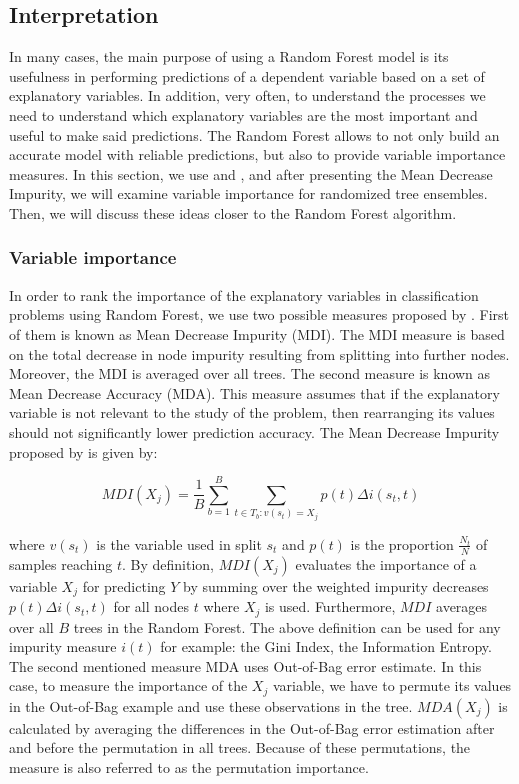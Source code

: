\subsection{Interpretation}
In many cases, the main purpose of using a Random Forest model is its usefulness in performing predictions 
of a dependent variable based on a set of explanatory variables. 
In addition, very often, to understand the processes we need to understand
which explanatory variables are the most important and useful to make said predictions. 
The Random Forest allows to not only build an accurate model with reliable predictions, 
but also to provide variable importance measures.
In this section, we  use \cite{louppe2013understanding} 
and \cite{gerard2016foresttour}, and after presenting the Mean Decrease Impurity,
we will examine variable importance for randomized tree ensembles.
Then, we will discuss these ideas closer to the Random Forest algorithm.

\subsubsection{Variable importance}
In order to rank the importance of the explanatory variables in classification problems using Random Forest, 
we use two possible measures proposed by \cite{breiman2001random}. 
First of them is known as Mean Decrease Impurity (MDI). The MDI measure is based on the total decrease in node impurity 
resulting from splitting into further nodes. Moreover, the MDI is averaged over all trees. 
The second measure is known as Mean Decrease Accuracy (MDA). 
This measure assumes that if the explanatory variable is not relevant to the study of the problem,
then rearranging its values should not significantly lower prediction accuracy.
The Mean Decrease Impurity proposed by \cite{breiman2001random} is given by: 

\begin{equation}\label{eq:MDI}
	{MDI}( X_{j} ) = \frac{1}{B} \displaystyle \sum_{b=1}^{B}  \displaystyle\sum_{t \in T_{b}: v(s_{t})=  X_{j}  } p(t)\Delta i(s_{t}, t)
\end{equation}

where $ v(s_{t}) $ is the variable used in split $s_{t}$ and $ p(t) $ is the proportion $\frac{N_{t}}{N}$ of samples reaching $t$.
By definition, $ MDI( X_{j} ) $ evaluates the importance of a variable $ X_{j} $ for predicting $Y$ by 
summing over the weighted impurity decreases $p(t) \Delta i(s_{t}, t)$ for all nodes $t$ where $ X_{j}$ is used. 
Furthermore, $MDI$ averages over all $B$ trees in the Random Forest. 
The above definition can be used for any impurity measure $i(t)$ for example: the Gini Index, the Information Entropy. 
The second mentioned measure MDA uses Out-of-Bag error estimate.
In this case, to measure the importance of the $X_{j}$ variable, we have to permute its values in the Out-of-Bag example and 
use these observations in the tree. $ MDA( X_{j} )$ is calculated by averaging the differences in the
Out-of-Bag error estimation after and before the permutation in all trees. Because of these permutations, 
the measure is also referred to as the permutation importance.

